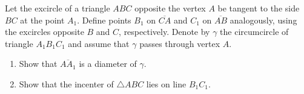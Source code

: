 Let the excircle of a triangle $ABC$ opposite the vertex $A$ be tangent to the side $BC$ at the point $A_1$. Define points $B_1$ on $\overline{CA}$ and $C_1$ on $\overline{AB}$ analogously, using the excircles opposite $B$ and $C$, respectively. Denote by $\gamma$ the circumcircle of triangle $A_1B_1C_1$ and assume that $\gamma$ passes through vertex $A$.
\begin{enumerate}[label=\alph*.]
	\item Show that $\overline{AA_1}$ is a diameter of $\gamma$.
	\item Show that the incenter of $\triangle ABC$ lies on line $B_1C_1$.
\end{enumerate}